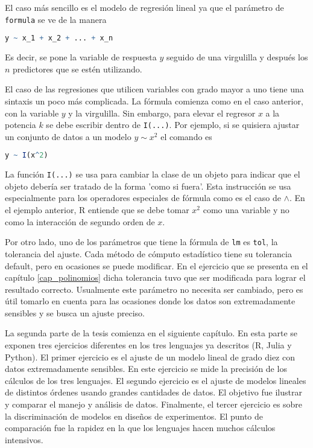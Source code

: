 El caso más sencillo es el modelo de regresión lineal ya que el parámetro de \texttt{formula} se ve de la manera 
\begin{lstlisting}[language=R]
	y ~ x_1 + x_2 + ... + x_n
\end{lstlisting}

Es decir, se pone la variable de respuesta $y$ seguido de una virgulilla y después los $n$ predictores que se estén utilizando. 

El caso de las regresiones que utilicen variables con grado mayor a uno tiene una sintaxis un poco más complicada. La fórmula comienza como en el caso anterior, con la variable $y$ y la virgulilla. Sin embargo, para elevar el regresor $x$ a la potencia $k$ se debe escribir dentro de \texttt{I(...)}. Por ejemplo, si se quisiera ajustar un conjunto de datos a un modelo $y \sim x^{2}$ el comando es

\begin{lstlisting}[language=R]
	y ~ I(x^2)
\end{lstlisting}

La función \texttt{I(...)} se usa para cambiar la clase de un objeto para indicar que el objeto debería ser tratado de la forma 'como si fuera'. Esta instrucción se usa especialmente para los operadores especiales de fórmula como es el caso de \texttt{$\wedge$}. En el ejemplo anterior, \textsf{R} entiende que se debe tomar $x^{2}$ como una variable y no como la interacción de segundo orden de $x$. 

Por otro lado, uno de los parámetros que tiene la fórmula de \texttt{lm} es \texttt{tol}, la tolerancia del ajuste. Cada método de cómputo estadístico tiene su tolerancia default, pero en ocasiones se puede modificar. En el ejercicio que se presenta en el capítulo \ref{cap_polinomios} dicha tolerancia tuvo que ser modificada para lograr el resultado correcto. Usualmente este parámetro no necesita ser cambiado, pero es útil tomarlo en cuenta para las ocasiones donde los datos son extremadamente sensibles y se busca un ajuste preciso. 


La segunda parte de la tesis comienza en el siguiente capítulo. En esta parte se exponen tres ejercicios diferentes en los tres lenguajes ya descritos (\textsf{R, Julia} y \textsf{Python}). El primer ejercicio es el ajuste de un modelo lineal de grado diez con datos extremadamente sensibles. En este ejercicio se mide la precisión de los cálculos de los tres lenguajes. El segundo ejercicio es el ajuste de modelos lineales de distintos órdenes usando grandes cantidades de datos. El objetivo fue ilustrar y comparar el manejo y análisis de datos. Finalmente, el tercer ejercicio es sobre la discriminación de modelos en diseños de experimentos. El punto de comparación fue la rapidez en la que los lenguajes hacen muchos cálculos intensivos. 


